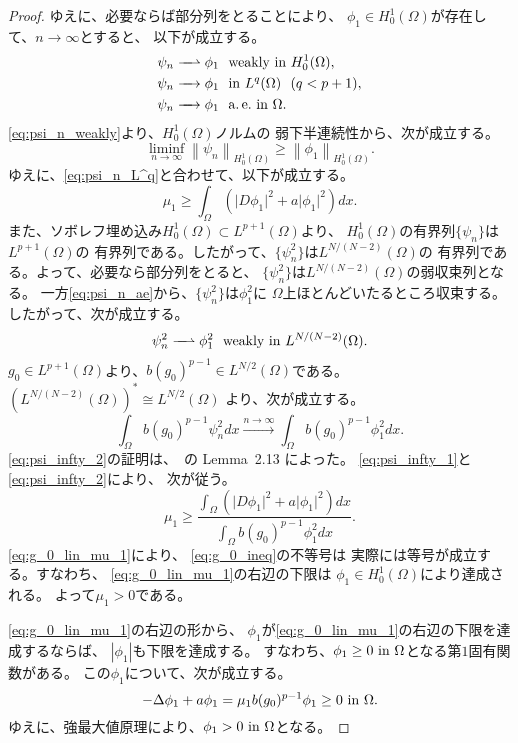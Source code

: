 \begin{proof}
 ゆえに、必要ならば部分列をとることにより、
 $\phi_1 \in H_0^1(\Omega)$が存在して、$n \to \infty$とすると、
 以下が成立する。
 \begin{align}
  \psi_n \xrightharpoonup{ \mbox{ ~ } } \phi_1 & \ \ \text{weakly~} \tin
  H_0^1(\Omega), \label{eq:psi_n_weakly} \\
  \psi_n \xrightarrow{ \mbox{ ~ } } \phi_1 & \ \ \tin L^q(\Omega) \ \
   (q < p+1), \label{eq:psi_n_L^q} \\
  \psi_n \xrightarrow{ \mbox{ ~ } } \phi_1 & \ \ \ae \tin \Omega. 
    \label{eq:psi_n_ae} 
 \end{align}
 \eqref{eq:psi_n_weakly}より、$H_0^1(\Omega)$ノルムの
 弱下半連続性から、次が成立する。
 \[
  \liminf_{n \to \infty} \left\| \psi_n \right\|_{H_0^1(\Omega)}
 \geq \left\| \phi_1 \right\|_{H_0^1(\Omega)}.
 \]
 ゆえに、\eqref{eq:psi_n_L^q}と合わせて、以下が成立する。
 \begin{equation}
  \mu_1 \geq \int_\Omega \left( \lvert D\phi_1 \rvert^2 + a \lvert
                          \phi_1 \rvert^2
                         \right) dx. \label{eq:psi_infty_1}
 \end{equation}
 また、ソボレフ埋め込み$H_0^1(\Omega) \subset L^{p+1}(\Omega)$より、
 $H_0^1(\Omega)$の有界列$\{ \psi_n \}$は$L^{p+1}(\Omega)$の
 有界列である。したがって、$\{ \psi_n^2 \}$は$L^{N/(N-2)}(\Omega)$の
 有界列である。よって、必要なら部分列をとると、
 $\{\psi_n^2 \}$は$L^{N/(N-2)}(\Omega)$の弱収束列となる。
 一方\eqref{eq:psi_n_ae}から、$\{ \psi_n^2 \}$は$\phi_1^2$に
 $\Omega$上ほとんどいたるところ収束する。したがって、次が成立する。
 \[
 \psi_n^2 \xrightharpoonup{ \mbox{ ~ } } \phi_1^2 \ \ \text{weakly~} \tin
 L^{N/(N-2)}(\Omega).
 \]
 $g_0 \in L^{p+1}(\Omega)$より、$b (g_0)^{p-1} \in
 L^{N/2} (\Omega)$である。$\left(L^{N/(N-2)}(\Omega)\right)^*
 \cong L^{N/2}(\Omega)$
 より、次が成立する。
 \begin{equation}
  \int_\Omega b(g_0)^{p-1} \psi_n^2 dx \xrightarrow{n \to \infty}
   \int_{\Omega} b(g_0)^{p-1} \phi_1^2 dx. \label{eq:psi_infty_2}
 \end{equation}
 \eqref{eq:psi_infty_2}の証明は、\cite{MR1400007}~の Lemma~2.13 によった。
 \eqref{eq:psi_infty_1}と\eqref{eq:psi_infty_2}により、
 次が従う。
 \begin{equation}
  \mu_1 \geq \frac{\displaystyle \int_\Omega 
   \left( \lvert D\phi_1 \rvert^2 + a \lvert \phi_1 \rvert^2
   \right) dx}{\displaystyle \int_{\Omega} b(g_0)^{p-1} 
   \phi_1^2 dx}. \label{eq:g_0_ineq}
 \end{equation}
 \eqref{eq:g_0_lin_mu_1}により、
 \eqref{eq:g_0_ineq}の不等号は
 実際には等号が成立する。すなわち、
 \eqref{eq:g_0_lin_mu_1}の右辺の下限は
 $\phi_1 \in H_0^1(\Omega)$により達成される。
 よって$\mu_1 > 0$である。
 
 \eqref{eq:g_0_lin_mu_1}の右辺の形から、
 $\phi_1$が\eqref{eq:g_0_lin_mu_1}の右辺の下限を達成するならば、
 $\left| \phi_1 \right|$も下限を達成する。
 すなわち、$\phi_1 \geq 0 ~\text{in}~ \Omega$となる第$1$固有関数がある。
 この$\phi_1$について、次が成立する。
 \[
  - \Delta \phi_1 + a \phi_1 = \mu_1 b (g_0)^{p-1} 
 \phi_1 \geq 0 ~\text{in}~ \Omega.
 \]
 ゆえに、強最大値原理により、$\phi_1 > 0 ~\text{in}~ \Omega$となる。
 \qedhere
\end{proof}

